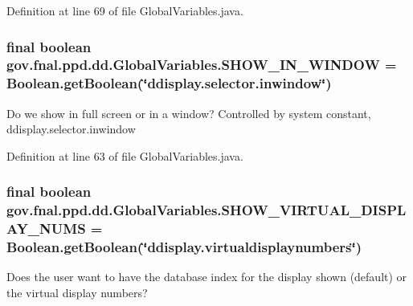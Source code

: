 Definition at line 69 of file Global\-Variables.\-java.

\hypertarget{classgov_1_1fnal_1_1ppd_1_1dd_1_1GlobalVariables_af0e7b37c8bf6495b999b93ed0f4f1c76}{
\subsubsection[{S\-H\-O\-W\-\_\-\-I\-N\-\_\-\-W\-I\-N\-D\-O\-W}]{\setlength{\rightskip}{0pt plus 5cm}final boolean gov.\-fnal.\-ppd.\-dd.\-Global\-Variables.\-S\-H\-O\-W\-\_\-\-I\-N\-\_\-\-W\-I\-N\-D\-O\-W = Boolean.\-get\-Boolean(\char`\"{}ddisplay.\-selector.\-inwindow\char`\"{})\hspace{0.3cm}{\ttfamily [static]}}}\label{classgov_1_1fnal_1_1ppd_1_1dd_1_1GlobalVariables_af0e7b37c8bf6495b999b93ed0f4f1c76}
Do we show in full screen or in a window? Controlled by system constant, ddisplay.\-selector.\-inwindow 

Definition at line 63 of file Global\-Variables.\-java.

\hypertarget{classgov_1_1fnal_1_1ppd_1_1dd_1_1GlobalVariables_a7ccfa5abda77efe03cd888f14d4171a3}{
\subsubsection[{S\-H\-O\-W\-\_\-\-V\-I\-R\-T\-U\-A\-L\-\_\-\-D\-I\-S\-P\-L\-A\-Y\-\_\-\-N\-U\-M\-S}]{\setlength{\rightskip}{0pt plus 5cm}final boolean gov.\-fnal.\-ppd.\-dd.\-Global\-Variables.\-S\-H\-O\-W\-\_\-\-V\-I\-R\-T\-U\-A\-L\-\_\-\-D\-I\-S\-P\-L\-A\-Y\-\_\-\-N\-U\-M\-S = Boolean.\-get\-Boolean(\char`\"{}ddisplay.\-virtualdisplaynumbers\char`\"{})\hspace{0.3cm}{\ttfamily [static]}}}\label{classgov_1_1fnal_1_1ppd_1_1dd_1_1GlobalVariables_a7ccfa5abda77efe03cd888f14d4171a3}
Does the user want to have the database index for the display shown (default) or the virtual display numbers? 

